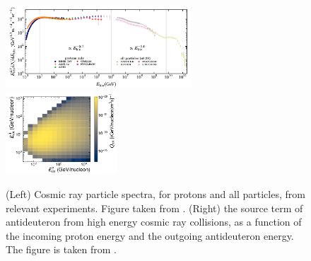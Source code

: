 \begin{figure}
    \centering
    \includegraphics[width=0.62\textwidth]{figures/ThomasP_cosmic_ray_spectra.png}
    \includegraphics[width=0.37\textwidth]{figures/dbar_2dplot_production.png}
    \caption{(Left) Cosmic ray particle spectra, for protons and all particles, from relevant experiments. Figure taken from \cite{ThomasThesis}. (Right) the source term of antideuteron from high energy cosmic ray collisions, as a function of the incoming proton energy and the outgoing antideuteron energy. The figure is taken from \cite{dbar paper}.}
    \label{fig:CR_spectra_Thomas}
\end{figure}


